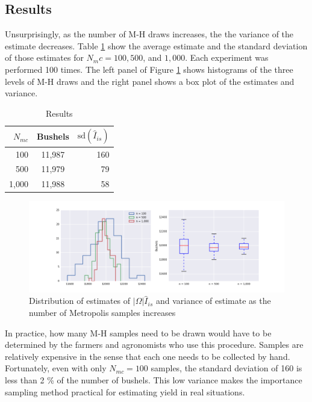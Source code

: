 \documentclass[thesis]{hmcposter}
\begin{document}
\begin{poster}
\section{Results}

Unsurprisingly, as the number of M-H draws increases, the the variance of the estimate decreases. Table \ref{tab:results} show the average estimate and the standard deviation of those estimates for $N_mc = 100, 500$, and $1,000$. Each experiment was performed 100 times. The left panel of Figure \ref{fig:results} shows histograms of the three levels of M-H draws and the right panel shows a box plot of the estimates and variance.

\begin{table}[H]
\begin{center}
\caption{Results}%
\begin{tabular}{rcr}
\hline
$N_{mc}$ & Bushels &  $\textrm{sd}(\hat{I}_{is})$ \\
\hline
100   & 11,987 & 160 \\
500   & 11,979 & 79 \\
1,000 & 11,988 & 58\\
\hline
\end{tabular}
\label{tab:results}
\end{center}
\end{table}

\begin{figure}
\begin{center}
\includegraphics[width=15in]{figures/results}
\caption{Distribution of estimates of $|\Omega|\hat{I}_{is}$ and variance of estimate as the number of Metropolis samples increases}%
\label{fig:results}
\end{center}
\end{figure}

In practice, how many M-H samples need to be drawn would have to be determined by the farmers and agronomists who use this procedure. Samples are relatively expensive in the sense that each one needs to be collected by hand. 
Fortunately, even with only $N_{mc}= 100$ samples, the standard deviation of 160 is less than 2 \% of the number of bushels. This low variance makes the importance sampling method practical for estimating yield in real situations.




\end{poster}
\end{document}
